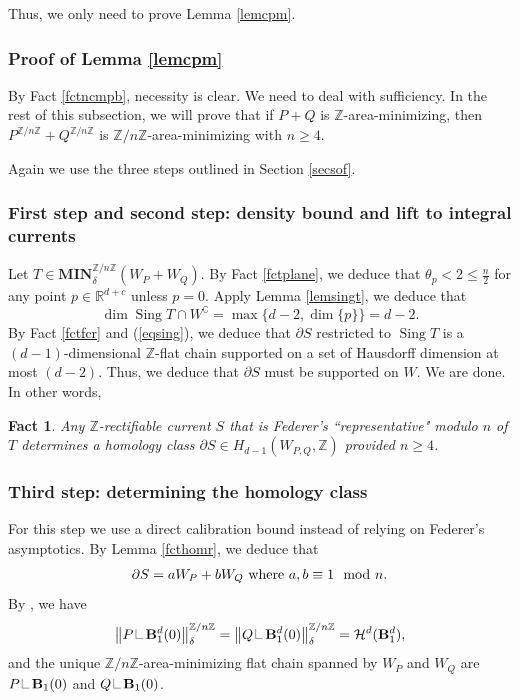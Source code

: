 \documentclass[11pt,a4paper]{amsart}
\numberwithin{equation}{section}
\newcommand{\sing}{\operatorname{Sing}}
\newcommand{\mn}{\mathbf{MIN}}
\newcommand{\de}{\delta}
\newcommand\res{\mathop{\hbox{\vrule height 7pt width .3pt depth 0pt
			\vrule height .3pt width 5pt depth 0pt}}\nolimits}
\newcommand{\cp}{^\complement}
\newcommand{\no}[1]{\left\lVert#1\right\rVert}
\newcommand{\pd}{\partial}
\newcommand{\R}{\mathbb{R}}
\newcommand{\Z}{\mathbb{Z}}
\theoremstyle{plain}
\newtheorem{fact}{Fact}[subsection]
\theoremstyle{definition}
\numberwithin{equation}{subsection}
\begin{document}
	Thus, we only need to prove Lemma \ref{lemcpm}.
	\subsubsection{Proof of Lemma \ref{lemcpm}}\label{secpfred}
By Fact \ref{fctncmpb}, necessity is clear. We need to deal with sufficiency. In the rest of this subsection, we will prove that if $P+Q$ is $\Z$-area-minimizing, then $P^{\Z/n\Z}+Q^{\Z/n\Z}$ is $\Z/n\Z$-area-minimizing  with $n\ge 4.$

Again we use the three steps outlined in Section \ref{secsof}.
\subsubsection{First step and second step: density bound and lift to integral currents}
Let $T\in\mn_\de^{\Z/n\Z}(W_P+W_Q)$. By Fact \ref{fctplane}, we deduce that $\theta_p<2\le \frac{n}{2}$ for any point $p\in\R^{d+c}$ unless $p=0.$ Apply Lemma \ref{lemsingt}, we deduce that $$\dim\sing T\cap W\cp=\max\{d-2,\dim\{p\}\}=d-2.$$ By Fact \ref{fctfcr} and (\ref{eqsing}), we deduce that $\pd S$ restricted to $\sing T$ is a $(d-1)$-dimensional $\Z$-flat chain supported on a set of Hausdorff dimension at most $(d-2)$. Thus, we deduce that $\pd S$ must be supported on $W.$ We are done. In other words,
\begin{fact}\label{fctfrmnp}
	Any $\Z$-rectifiable current $S$ that is Federer's ``representative" modulo $n$ of $T$ determines a homology class $\pd S\in H_{d-1}(W_{P,Q},\Z)$ provided $n\ge 4$.
\end{fact}
\subsubsection{Third step: determining the homology class}
For this step we use a direct calibration bound instead of relying on Federer's asymptotics. By Lemma \ref{fcthomr}, we deduce that
\begin{align*}
	\pd S=aW_P+bW_Q\textnormal{ where }a,b\equiv 1\mod n.
\end{align*}By \cite[Remarks right after 2.2 Theorem]{FMcalv}, we have
\begin{align*}
	\no{P\res\mathbf{B}_1^{d}(0)}^{\Z/n\Z}_\de=\no{Q\res\mathbf{B}_1^{d}(0)}^{\Z/n\Z}_\de=\mathcal{H}^d(\mathbf{B}_1^{d}),
\end{align*}
and the unique $\Z/n\Z$-area-minimizing flat chain spanned by $W_P$ and $W_Q$ are $P\res \mathbf{B}_1(0)$ and $Q\res \mathbf{B}_1(0)$.
\end{document}
